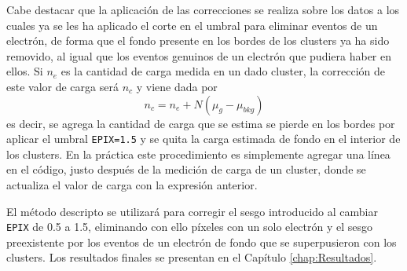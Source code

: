 Cabe destacar que la aplicación de las correcciones se realiza sobre los datos a los cuales ya se les ha aplicado el corte en el umbral para eliminar eventos de un electrón, de forma que el fondo presente en los bordes de los clusters ya ha sido removido, al igual que los eventos genuinos de un electrón que pudiera haber en ellos. Si $n_{e}$ es la cantidad de carga medida en un dado cluster, la corrección de este valor de carga será $n_{c}$ y viene dada por
\begin{equation*}
    n_{c} = n_{e} + N(\mu_{g} - \mu_{bkg})
\end{equation*}
es decir, se agrega la cantidad de carga que se estima se pierde en los bordes por aplicar el umbral \verb|EPIX=1.5| y se quita la carga estimada de fondo en el interior de los clusters. En la práctica este procedimiento es simplemente agregar una línea en el código, justo después de la medición de carga de un cluster, donde se actualiza el valor de carga con la expresión anterior.

El método descripto se utilizará para corregir el sesgo introducido al cambiar \verb|EPIX| de 0.5 a 1.5, eliminando con ello píxeles con un solo electrón y el sesgo preexistente por los eventos de un electrón de fondo que se superpusieron con los clusters. Los resultados finales se presentan en el Capítulo \ref{chap:Resultados}.